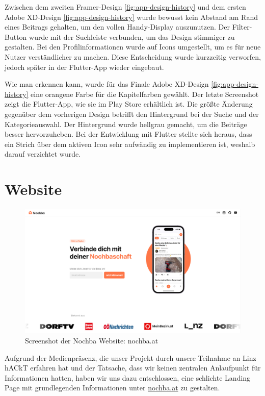 Zwischen dem zweiten Framer-Design
\ref{fig:app-design-history} und dem ersten Adobe XD-Design
\ref{fig:app-design-history} wurde bewusst kein Abstand am
Rand eines Beitrags gehalten, um den vollen Handy-Display
auszunutzen. Der Filter-Button wurde mit der Suchleiste
verbunden, um das Design stimmiger zu gestalten. Bei den
Profilinformationen wurde auf Icons umgestellt, um es für
neue Nutzer verständlicher zu machen. Diese Entscheidung
wurde kurzzeitig verworfen, jedoch später in der Flutter-App
wieder eingebaut.

Wie man erkennen kann, wurde für das Finale Adobe
XD-Design \ref{fig:app-design-history} eine orangene Farbe für die Kapitelfarben
gewählt. Der letzte Screenshot zeigt die Flutter-App, wie
sie im Play Store erhältlich ist. Die größte Änderung
gegenüber dem vorherigen Design betrifft den Hintergrund
bei der Suche und der Kategorieauswahl. Der Hintergrund
wurde hellgrau gemacht, um die Beiträge besser hervorzuheben.
Bei der Entwicklung mit Flutter stellte sich heraus, dass
ein Strich über dem aktiven Icon sehr aufwändig zu
implementieren ist, weshalb darauf verzichtet wurde.



\section{Website}
\begin{figure}[h]
  \includegraphics[width=1\textwidth]{pics/website-design.png}
  \caption{Screenshot der Nochba Website: nochba.at}
\end{figure}

Aufgrund der Medienpräsenz, die unser Projekt durch unsere Teilnahme an Linz hACkT erfahren hat und der Tatsache, dass wir keinen zentralen Anlaufpunkt für Informationen hatten, haben wir uns dazu entschlossen, eine schlichte Landing Page mit grundlegenden Informationen unter \href{https://nochba.at}{nochba.at} zu gestalten.

